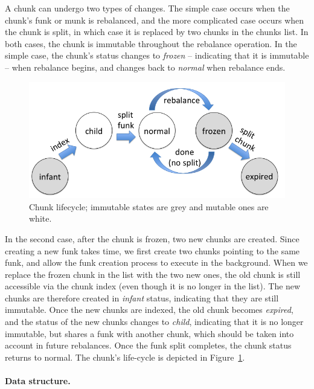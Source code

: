 A chunk can undergo two types of changes. The simple case occurs when the chunk's funk or munk is rebalanced,
and the more complicated  case occurs when the chunk is split, in which case it is replaced by two chunks in the chunks list.
In both cases, the chunk is immutable throughout the rebalance operation. 
In the simple case, the chunk's status changes to \emph{frozen} -- indicating that it is immutable -- 
when rebalance begins, and changes back to \emph{normal} when rebalance ends.  

\begin{figure}[htb]
\centerline{
\includegraphics[width=\columnwidth]{status.png}
}
\caption{Chunk lifecycle; immutable states are grey and mutable ones are white.}
\label{fig:status}
\end{figure}

In the second case, after the chunk is frozen, two new chunks are created. 
Since creating a new funk takes time, we first create two chunks pointing to the same funk, and allow the funk
creation process to execute in the background. 
When we replace the frozen chunk in the list with the two new ones, 
the old chunk is still accessible via the chunk index (even though it is no longer in the list). 
The new chunks are therefore created in \emph{infant} status, indicating that they are still immutable. 
Once the new chunks are indexed, the old chunk becomes \emph{expired}, and the status of the new chunks
changes to \emph{child}, indicating that it is no longer immutable, but shares a funk with another chunk,
which should be taken into account in future rebalances. Once the funk split completes, the chunk
status returns to normal. 
The chunk's life-cycle is depicted in Figure~\ref{fig:status}.

\paragraph{Data structure.}

